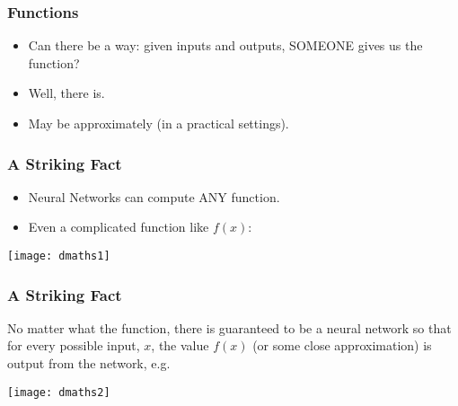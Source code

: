 

\begin{frame}[fragile]\frametitle{Functions}
\begin{itemize}
\item Can there be a way: given inputs and outputs, SOMEONE gives us the function?
\item Well, there is.
\item May be approximately (in a practical settings).
\end{itemize}


\end{frame}

\begin{frame}[fragile] \frametitle{A Striking Fact}
\begin{itemize}
\item Neural Networks can compute ANY function.
\item Even a complicated function like $f(x)$:
\end{itemize}

\begin{center}
\texttt{[image: dmaths1]}
\end{center}
\end{frame}

\begin{frame}[fragile] \frametitle{A Striking Fact}
No matter what the function, there is guaranteed to be a neural network so that for every possible input, $x$, the value $f(x)$ (or some close approximation) is output from the network, e.g.

\begin{center}
\texttt{[image: dmaths2]}
\end{center}
\end{frame}

